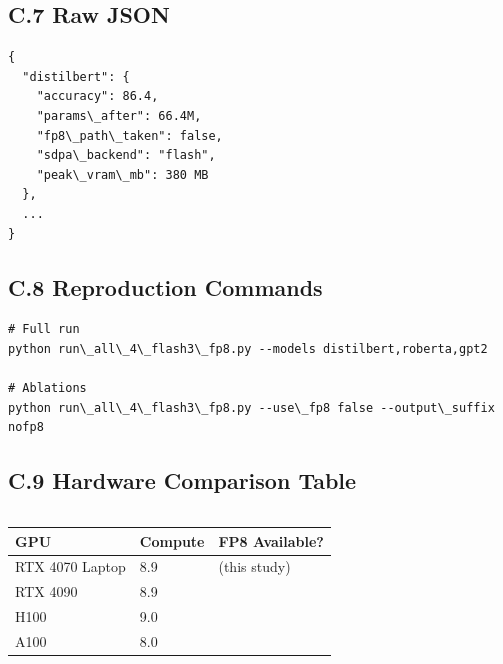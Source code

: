 \subsection{C.7 Raw JSON}

\begin{lstlisting}
{
  "distilbert": {
    "accuracy": 86.4,
    "params\_after": 66.4M,
    "fp8\_path\_taken": false,
    "sdpa\_backend": "flash",
    "peak\_vram\_mb": 380 MB
  },
  ...
}
\end{lstlisting}

\subsection{C.8 Reproduction Commands}

\begin{lstlisting}
# Full run
python run\_all\_4\_flash3\_fp8.py --models distilbert,roberta,gpt2

# Ablations
python run\_all\_4\_flash3\_fp8.py --use\_fp8 false --output\_suffix nofp8
\end{lstlisting}

\subsection{C.9 Hardware Comparison Table}

\begin{lstlisting}
\end{lstlisting}
\begin{table}[H]
\centering
\small
\begin{tabular}{lll}
\toprule
\textbf{GPU} & \textbf{Compute} & \textbf{FP8 Available?} \\
\midrule
RTX 4070 Laptop & 8.9 & (this study) \\
RTX 4090 & 8.9 &  \\
H100 & 9.0 &  \\
A100 & 8.0 &  \\
\bottomrule
\end{tabular}
\end{table}

